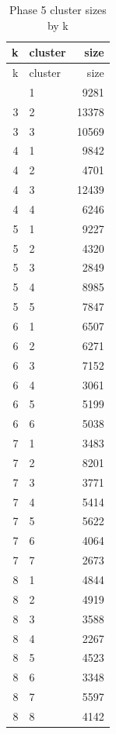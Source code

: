 \documentclass[
]{article}
\begin{document}
\begin{longtable}[]{@{}rlr@{}}
\caption{Phase 5 cluster sizes by k}\tabularnewline
\toprule\noalign{}
k & cluster & size \\
\midrule\noalign{}
\endfirsthead
\toprule\noalign{}
k & cluster & size \\
\midrule\noalign{}
\endhead
\bottomrule\noalign{}
\endlastfoot
3 & 1 & 9281 \\
3 & 2 & 13378 \\
3 & 3 & 10569 \\
4 & 1 & 9842 \\
4 & 2 & 4701 \\
4 & 3 & 12439 \\
4 & 4 & 6246 \\
5 & 1 & 9227 \\
5 & 2 & 4320 \\
5 & 3 & 2849 \\
5 & 4 & 8985 \\
5 & 5 & 7847 \\
6 & 1 & 6507 \\
6 & 2 & 6271 \\
6 & 3 & 7152 \\
6 & 4 & 3061 \\
6 & 5 & 5199 \\
6 & 6 & 5038 \\
7 & 1 & 3483 \\
7 & 2 & 8201 \\
7 & 3 & 3771 \\
7 & 4 & 5414 \\
7 & 5 & 5622 \\
7 & 6 & 4064 \\
7 & 7 & 2673 \\
8 & 1 & 4844 \\
8 & 2 & 4919 \\
8 & 3 & 3588 \\
8 & 4 & 2267 \\
8 & 5 & 4523 \\
8 & 6 & 3348 \\
8 & 7 & 5597 \\
8 & 8 & 4142 \\
\end{longtable}
\end{document}
